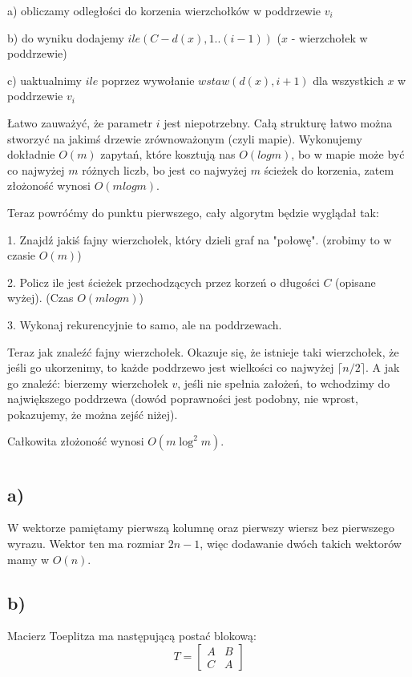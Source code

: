 a) obliczamy odległości do korzenia wierzchołków w poddrzewie $v_i$

b) do wyniku dodajemy $ile(C - d(x), 1..(i-1))$ ($x$ - wierzchołek w poddrzewie)

c) uaktualnimy $ile$ poprzez wywołanie $wstaw(d(x), i+1)$ dla wszystkich $x$ w poddrzewie $v_i$

Łatwo zauważyć, że parametr $i$ jest niepotrzebny. Całą strukturę łatwo można stworzyć na jakimś drzewie zrównoważonym (czyli mapie). Wykonujemy dokładnie $O(m)$ zapytań, które kosztują nas $O(log m)$, bo w mapie może być co najwyżej $m$ różnych liczb, bo jest co najwyżej $m$ ścieżek do korzenia, zatem złożoność wynosi $O(m log m)$.

Teraz powróćmy do punktu pierwszego, cały algorytm będzie wyglądał tak:

1. Znajdź jakiś fajny wierzchołek, który dzieli graf na "połowę". (zrobimy to w czasie $O(m)$)

2. Policz ile jest ścieżek przechodzących przez korzeń o długości $C$ (opisane wyżej). (Czas $O(m log m)$)

3. Wykonaj rekurencyjnie to samo, ale na poddrzewach.


Teraz jak znaleźć fajny wierzchołek. Okazuje się, że istnieje taki wierzchołek, że jeśli go ukorzenimy, to każde poddrzewo jest wielkości co najwyżej $\lceil n/2 \rceil$. A jak go znaleźć: bierzemy wierzchołek $v$, jeśli nie spełnia założeń, to wchodzimy do największego poddrzewa (dowód poprawności jest podobny, nie wprost, pokazujemy, że można zejść niżej).

Całkowita złożoność wynosi $O(m \log^2 m)$.

\section{} %
\subsection{a)}
W wektorze pamiętamy pierwszą kolumnę oraz pierwszy wiersz bez pierwszego wyrazu. Wektor ten ma rozmiar $2n - 1$, więc dodawanie dwóch takich wektorów mamy w $O(n)$.
\subsection{b)}
Macierz Toeplitza ma następującą postać blokową:
$$ T = \left[ \begin{matrix}
					A & B \\
					C & A
				\end{matrix} \right]$$


